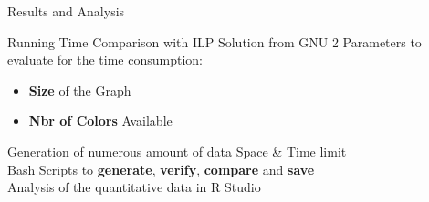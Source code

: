 \documentclass{beamer}
\begin{document}
\begin{frame}{Results and Analysis}

\begin{block}{Running Time Comparison with ILP Solution from GNU}
2 Parameters to evaluate for the time consumption:
\begin{itemize}
\item \textbf{Size} of the Graph
\item \textbf{Nbr of Colors} Available
\end{itemize}
 
\end{block}
\pause
Generation of numerous amount of data \textrightarrow{} Space \& Time limit\\
\pause \textrightarrow{}  Bash Scripts to \textbf{generate}, \textbf{verify}, \textbf{compare} and \textbf{save}\\
\pause \textrightarrow{}  Analysis of the quantitative data in R Studio



\end{frame}
\end{document}

